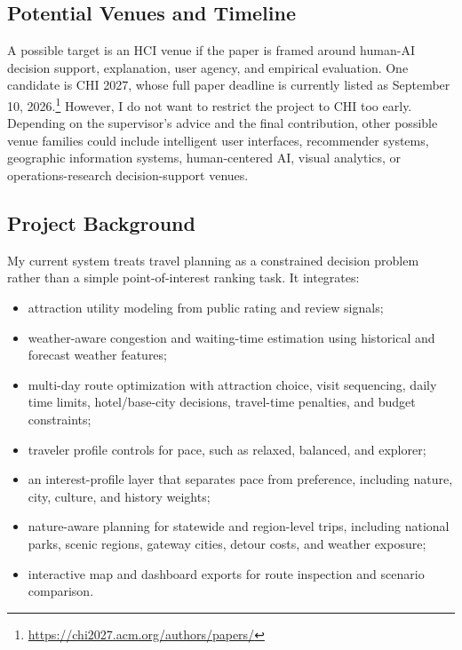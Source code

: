 \documentclass[11pt,a4paper]{article}
\begin{document}
\subsection*{Potential Venues and Timeline}

\noindent A possible target is an HCI venue if the paper is framed around human-AI decision support, explanation, user agency, and empirical evaluation. One candidate is CHI 2027, whose full paper deadline is currently listed as September 10, 2026.\footnote{\url{https://chi2027.acm.org/authors/papers/}} However, I do not want to restrict the project to CHI too early. Depending on the supervisor's advice and the final contribution, other possible venue families could include intelligent user interfaces, recommender systems, geographic information systems, human-centered AI, visual analytics, or operations-research decision-support venues.

\subsection*{Project Background}

\noindent My current system treats travel planning as a constrained decision problem rather than a simple point-of-interest ranking task. It integrates:

\begin{itemize}
    \item attraction utility modeling from public rating and review signals;
    \item weather-aware congestion and waiting-time estimation using historical and forecast weather features;
    \item multi-day route optimization with attraction choice, visit sequencing, daily time limits, hotel/base-city decisions, travel-time penalties, and budget constraints;
    \item traveler profile controls for pace, such as relaxed, balanced, and explorer;
    \item an interest-profile layer that separates pace from preference, including nature, city, culture, and history weights;
    \item nature-aware planning for statewide and region-level trips, including national parks, scenic regions, gateway cities, detour costs, and weather exposure;
    \item interactive map and dashboard exports for route inspection and scenario comparison.
\end{itemize}
\end{document}
